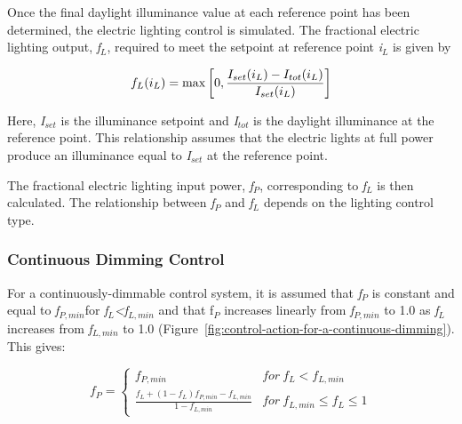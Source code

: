 Once the final daylight illuminance value at each reference point has been determined, the electric lighting control is simulated. The fractional electric lighting output, \emph{f\(_{L}\)}, required to meet the setpoint at reference point \emph{i\(_{L}\)} is given by

\begin{equation}
{f_L}({i_L}) = {\rm{max}}\left[ {0,\frac{{{I_{set}}({i_L}) - {I_{tot}}({i_L})}}{{{I_{set}}({i_L})}}} \right]
\end{equation}

Here, \emph{I\(_{set}\)} is the illuminance setpoint and \emph{I\(_{tot}\)} is the daylight illuminance at the reference point. This relationship assumes that the electric lights at full power produce an illuminance equal to \emph{I\(_{set}\)} at the reference point.

The fractional electric lighting input power, \emph{f\(_{P}\)}, corresponding to \emph{f\(_{L}\)} is then calculated. The relationship between \emph{f\(_{P}\)} and \emph{f\(_{L}\)} depends on the lighting control type.

\subsubsection{Continuous Dimming Control}\label{continuous-dimming-control}

For a continuously-dimmable control system, it is assumed that \emph{f\(_{P}\)} is constant and equal to \emph{f\(_{P,min}\)}for \emph{f\(_{L}\)\textless{}f\(_{L,min}\)} and that f\(_{P}\) increases linearly from \emph{f\(_{P,min}\)} to 1.0 as \emph{f\(_{L}\)} increases from \emph{f\(_{L,min}\)} to 1.0 (Figure~\ref{fig:control-action-for-a-continuous-dimming}). This gives:

\begin{equation}
  f_P = \left\{
          \begin{array}{cl}
            f_{P,min} & for~f_L < f_{L,min} \\
            \frac{f_L + (1 - f_L)f_{P,min} - f_{L,min}}{1 - f_{L,min}} & for~f_{L,min} \le f_L \le 1
          \end{array}
        \right.
\end{equation}

